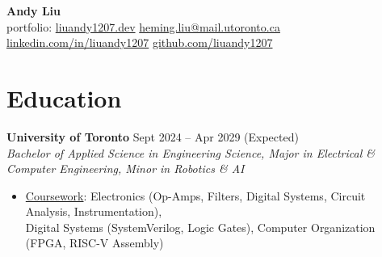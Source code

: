 \documentclass[10pt,letterpaper]{article}
\begin{document}
\begin{center}
\huge{\textbf{Andy Liu}} \\
\vspace{0.25em}
\small{{portfolio: 
    \href{https://liuandy1207.dev}{liuandy1207.dev}}
    \hspace{0.5em} \textbar\hspace{0.5em}
    \href{mailto: heming.liu@mail.utoronto.ca}{heming.liu@mail.utoronto.ca}
    \hspace{0.5em} \textbar\hspace{0.5em}
    \href{https://www.linkedin.com/in/liuandy1207/}{linkedin.com/in/liuandy1207}}
    \hspace{0.5em} \textbar\hspace{0.5em}
    \href{https://github.com/liuandy1207}{github.com/liuandy1207}
\end{center} \vspace{-0.7em}







\section{Education}

\textbf{University of Toronto} \hfill
Sept 2024 -- Apr 2029 (Expected) \\
\textit{Bachelor of Applied Science in Engineering Science, Major in Electrical \& Computer Engineering, Minor in Robotics \& AI} \hfill 
\begin{itemize}
    \item \underline{Coursework}: 
    Electronics (Op-Amps, Filters, Digital Systems, Circuit Analysis, Instrumentation), \\
    Digital Systems (SystemVerilog, Logic Gates),
    Computer Organization (FPGA, RISC-V Assembly)
\end{itemize} \vspace{0.25em}
\end{document}
